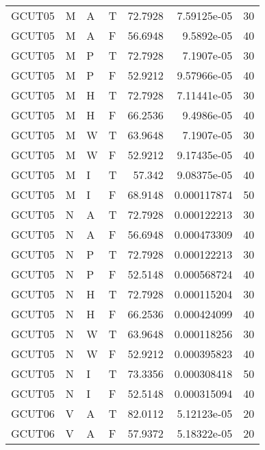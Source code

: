 \begin{longtable}{llllrrr}
    GCUT05   & M     & A     & T          & 72.7928    & 7.59125e-05 & 30       \\
    GCUT05   & M     & A     & F          & 56.6948    & 9.5892e-05  & 40       \\
    GCUT05   & M     & P     & T          & 72.7928    & 7.1907e-05  & 30       \\
    GCUT05   & M     & P     & F          & 52.9212    & 9.57966e-05 & 40       \\
    GCUT05   & M     & H     & T          & 72.7928    & 7.11441e-05 & 30       \\
    GCUT05   & M     & H     & F          & 66.2536    & 9.4986e-05  & 40       \\
    GCUT05   & M     & W     & T          & 63.9648    & 7.1907e-05  & 30       \\
    GCUT05   & M     & W     & F          & 52.9212    & 9.17435e-05 & 40       \\
    GCUT05   & M     & I     & T          & 57.342     & 9.08375e-05 & 40       \\
    GCUT05   & M     & I     & F          & 68.9148    & 0.000117874 & 50       \\
    GCUT05   & N     & A     & T          & 72.7928    & 0.000122213 & 30       \\
    GCUT05   & N     & A     & F          & 56.6948    & 0.000473309 & 40       \\
    GCUT05   & N     & P     & T          & 72.7928    & 0.000122213 & 30       \\
    GCUT05   & N     & P     & F          & 52.5148    & 0.000568724 & 40       \\
    GCUT05   & N     & H     & T          & 72.7928    & 0.000115204 & 30       \\
    GCUT05   & N     & H     & F          & 66.2536    & 0.000424099 & 40       \\
    GCUT05   & N     & W     & T          & 63.9648    & 0.000118256 & 30       \\
    GCUT05   & N     & W     & F          & 52.9212    & 0.000395823 & 40       \\
    GCUT05   & N     & I     & T          & 73.3356    & 0.000308418 & 50       \\
    GCUT05   & N     & I     & F          & 52.5148    & 0.000315094 & 40       \\
    GCUT06   & V     & A     & T          & 82.0112    & 5.12123e-05 & 20       \\
    GCUT06   & V     & A     & F          & 57.9372    & 5.18322e-05 & 20       \\

\end{longtable}
